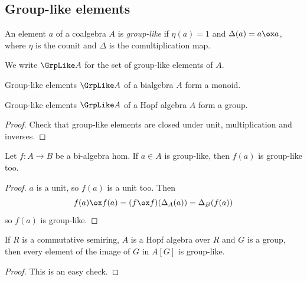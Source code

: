 \subsection{Group-like elements}


\begin{definition}
  \label{0-grp-like}
  \leanok

  An element $a$ of a coalgebra $A$ is \emph{group-like} if $\eta(a) = 1$ and $\Delta(a) = a \ox a$,
  where $\eta$ is the counit and $\Delta$ is the comultiplication map.

  We write $\GrpLike A$ for the set of group-like elements of $A$.
\end{definition}


\begin{proposition}
  \label{0-grp-like-grp}
  \leanok

  Group-like elements $\GrpLike A$ of a bialgebra $A$ form a monoid.

  Group-like elements $\GrpLike A$ of a Hopf algebra $A$ form a group.
\end{proposition}
\begin{proof}
  \leanok

  Check that group-like elements are closed under unit, multiplication and inverses.
\end{proof}


\begin{lemma}
  \label{0-grp-like-map}
  \leanok

  Let $f : A \to B$ be a bi-algebra hom. If $a \in A$ is group-like, then $f(a)$ is group-like too.
\end{lemma}
\begin{proof}
  \leanok

  $a$ is a unit, so $f(a)$ is a unit too. Then
  \[
    f(a) \ox f(a) = (f \ox f)(\Delta_A(a)) = \Delta_B(f(a))
  \]
  so $f(a)$ is group-like.
\end{proof}


\begin{lemma}
  \label{0-grp-like-grp-alg-of}
  \leanok

  If $R$ is a commutative semiring, $A$ is a Hopf algebra over $R$ and
  $G$ is a group, then every element of the image of $G$ in $A[G]$ is group-like.
\end{lemma}
\begin{proof}
  \leanok

  This is an easy check.
\end{proof}


